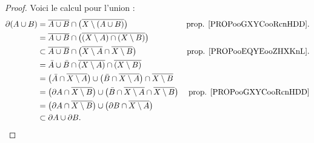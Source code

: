 \begin{proof}
	Voici le calcul pour l'union :
	\begin{subequations}
		\begin{align}
			\partial(A\cup B) & =\overline{A\cup B}\cap\big( \overline{X\setminus(A\cup B)} \big)                                                            & \text{prop. \ref{PROPooGXYCooRcnHDD}.} \\
			                  & =\overline{A\cup B}\cap\big( \overline{(X\setminus A)\cap(X\setminus B)} \big)                                                                                        \\
			                  & \subset\overline{A\cup B}\cap\big( \overline{X\setminus A}\cap\overline{X\setminus B} \big)                                  & \text{prop. \ref{PROPooEQYEooZHXKnL}.} \\
			                  & =\bar A\cup\bar B\cap\overline{(X\setminus A)}\cap\overline{(X\setminus B)}                                                                                           \\
			                  & =\big( \bar A\cap\overline{X\setminus A} \big)\cup\big( \bar B\cap\overline{X\setminus A} \big)\cap\overline{X\setminus B}                                            \\
			                  & =\big(\partial A\cap\overline{X\setminus B}\big)\cup\big( \bar B\cap\overline{X\setminus A}\cap\overline{X\setminus B} \big) & \text{prop. \ref{PROPooGXYCooRcnHDD}}  \\
			                  & =\big( \partial A\cap\overline{X\setminus B} \big)\cup\big( \partial B\cap \overline{X\setminus A}\big)                                                               \\
			                  & \subset\partial A\cup\partial B.
		\end{align}
	\end{subequations}


\end{proof}
